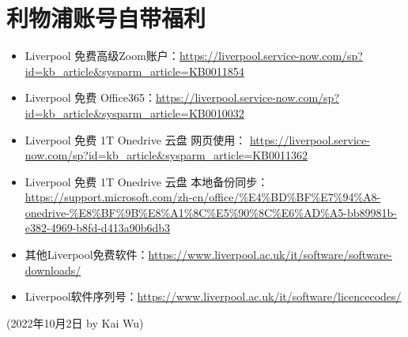 \section{利物浦账号自带福利}
\label{sec.fuli_liverpool}
\begin{itemize}
    \item Liverpool 免费高级Zoom账户：\url{https://liverpool.service-now.com/sp?id=kb_article&sysparm_article=KB0011854}
    \item Liverpool 免费 Office365：\url{https://liverpool.service-now.com/sp?id=kb_article&sysparm_article=KB0010032}
    \item Liverpool 免费 1T Onedrive 云盘 网页使用： \url{https://liverpool.service-now.com/sp?id=kb_article&sysparm_article=KB0011362}
    \item Liverpool 免费 1T Onedrive 云盘 本地备份同步： \url{https://support.microsoft.com/zh-cn/office/%E4%BD%BF%E7%94%A8-onedrive-%E8%BF%9B%E8%A1%8C%E5%90%8C%E6%AD%A5-bb89981b-e382-4969-b8fd-d413a90b6db3}
    \item 其他Liverpool免费软件：\url{https://www.liverpool.ac.uk/it/software/software-downloads/}
    \item Liverpool软件序列号：\url{https://www.liverpool.ac.uk/it/software/licencecodes/}
\end{itemize}

\begin{flushright}
    (2022年10月2日 by Kai Wu)
    \end{flushright}